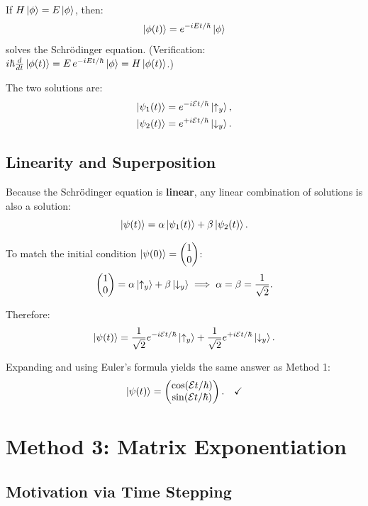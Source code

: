 \documentclass[11pt,a4paper]{article}
\theoremstyle{definition}
\theoremstyle{plain}
\theoremstyle{remark}
\begin{document}
If $H\ket{\phi} = E\ket{\phi}$, then:
\[
    \ket{\phi(t)} = e^{-iEt/\hbar}\ket{\phi}
\]
solves the Schr\"odinger equation. (Verification: $i\hbar\frac{d}{dt}\ket{\phi(t)} = E\,e^{-iEt/\hbar}\ket{\phi} = H\ket{\phi(t)}$.)

The two solutions are:
\begin{align}
    \ket{\psi_1(t)} &= e^{-i\mathcal{E}t/\hbar}\ket{\uparrow_y}, \\
    \ket{\psi_2(t)} &= e^{+i\mathcal{E}t/\hbar}\ket{\downarrow_y}.
\end{align}

\subsection{Linearity and Superposition}

Because the Schr\"odinger equation is \textbf{linear}, any linear combination of solutions is also a solution:
\[
    \ket{\psi(t)} = \alpha\ket{\psi_1(t)} + \beta\ket{\psi_2(t)}.
\]

To match the initial condition $\ket{\psi(0)} = \begin{pmatrix}1\\0\end{pmatrix}$:
\[
    \begin{pmatrix}1\\0\end{pmatrix} = \alpha\ket{\uparrow_y} + \beta\ket{\downarrow_y} \implies \alpha = \beta = \frac{1}{\sqrt{2}}.
\]

Therefore:
\[
    \ket{\psi(t)} = \frac{1}{\sqrt{2}}e^{-i\mathcal{E}t/\hbar}\ket{\uparrow_y} + \frac{1}{\sqrt{2}}e^{+i\mathcal{E}t/\hbar}\ket{\downarrow_y}.
\]

Expanding and using Euler's formula yields the same answer as Method 1:
\[
    \ket{\psi(t)} = \begin{pmatrix}\cos(\mathcal{E}t/\hbar) \\ \sin(\mathcal{E}t/\hbar)\end{pmatrix}. \quad\checkmark
\]

\section{Method 3: Matrix Exponentiation}

\subsection{Motivation via Time Stepping}
\end{document}
